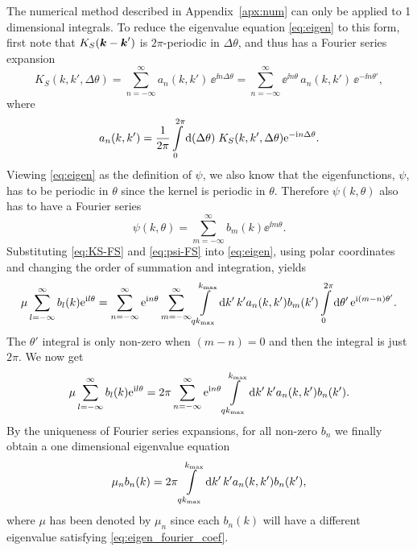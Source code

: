 \documentclass[11pt,a4paper, 
swedish,english %
]{article}
\begin{document}
The numerical method described in Appendix~\ref{apx:num} can only be
applied to 1 dimensional integrals.
To reduce the eigenvalue equation \eqref{eq:eigen} to this form, first
note that $K_S(\vb*k-\vb*k')$ is $2\pi$-periodic in $\Delta\theta$,
and thus has a Fourier series expansion  
\begin{equation} \label{eq:KS-FS}
K_S(k, k', \Delta\theta)  
=\sum_{n=-\infty}^\infty a_{n}(k, k')\, \ee^{\ii n\Delta\theta}
=\sum_{n=-\infty}^\infty \ee^{\ii n\theta}\,a_{n}(k, k')\,\ee^{-\ii n\theta'},
\end{equation}
where 
\begin{equation} \label{eq:KS-FS-coef}
a_{n}(k, k') = \frac{1}{2\pi} \int_0^{2\pi} \rd(\Delta\theta)\; 
K_S(k, k', \Delta\theta)\ee^{-\ii n\Delta\theta}.
\end{equation}
Viewing \eqref{eq:eigen} as the definition of $\psi$, we also know
that the eigenfunctions, $\psi$, has to be periodic in 
$\theta$ since the kernel is periodic in $\theta$. Therefore
$\psi(k, \theta)$ also has to have a Fourier series 
\begin{equation}\label{eq:psi-FS}
\psi(k, \theta) = \sum_{m=-\infty}^\infty b_m(k)\ee^{\ii m\theta}.
\end{equation}
Substituting \eqref{eq:KS-FS} and \eqref{eq:psi-FS} into
\eqref{eq:eigen}, using polar coordinates and changing the order of
summation and integration, yields
\begin{equation}
\mu\sum_{l=-\infty}^\infty b_l(k)\ee^{\ii l\theta}
= \sum_{n=-\infty}^\infty \ee^{\ii n\theta} \sum_{m=-\infty}^\infty 
\int_{qk_{\max}}^{k_{\max}}\rd{k'}\,k' a_n(k, k') b_m(k')
\int_{0}^{2\pi}\rd\theta'\,
\ee^{\ii (m-n)\theta'}.
\end{equation}
The $\theta'$ integral is only non-zero when $(m-n)=0$ and
then the integral is just $2\pi$. We now get
\begin{equation}
\mu\sum_{l=-\infty}^\infty b_l(k)\ee^{\ii l\theta}
= 2\pi\sum_{n=-\infty}^\infty \ee^{\ii n\theta} 
\int_{qk_{\max}}^{k_{\max}}\rd{k'}\,k' a_n(k, k') b_n(k').
\end{equation}
By the uniqueness of Fourier series expansions, for all non-zero $b_n$
we finally obtain a one dimensional eigenvalue equation
\begin{equation}
\label{eq:eigen_fourier_coef}
\mu_n b_n(k) = 2\pi\int_{qk_{\max}}^{k_{\max}}\rd{k'}\,k' a_n(k, k') b_n(k'),
\end{equation}
where $\mu$ has been denoted by $\mu_n$ since each $b_n(k)$
will have a different eigenvalue satisfying
\eqref{eq:eigen_fourier_coef}.  
\end{document}
